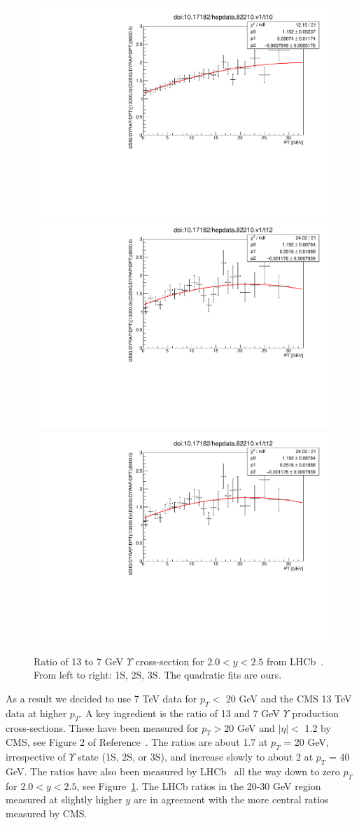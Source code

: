 \documentclass[12pt]{article}
\begin{document}
\begin{figure}
\begin{adjustwidth}{-2cm}{-2cm}
\centering
\includegraphics[width=0.32\linewidth]{../oniaDirect/LHCB-13-TeV/ups1s-13to7eta20to25.pdf}
\includegraphics[width=0.32\linewidth]{../oniaDirect/LHCB-13-TeV/ups3s-13to7eta20to25.pdf}
\includegraphics[width=0.32\linewidth]{../oniaDirect/LHCB-13-TeV/ups3s-13to7eta20to25.pdf}
\end{adjustwidth}
\caption{\protect Ratio of 13 to 7 GeV $\Upsilon$ cross-section for $2.0 < y < 2.5$
  from LHCb~\cite{Aaij:2018pfp}.  From left to right: 1S, 2S, 3S. 
  The quadratic fits are ours.}
\label{fig:upsratio}
\end{figure}


  
  As a result we decided to use 7 TeV data for $p_T <$ 20 GeV and the CMS
  13 TeV data at higher $p_T$.  A key ingredient is the ratio of 13 and 7
  GeV $\Upsilon$ production cross-sections.  These have been measured
  for $p_T > 20$ GeV and $|\eta| <$ 1.2 by CMS,
  see Figure 2 of Reference~\cite{Sirunyan:2017qdw}. The ratios
  are about 1.7 at $p_T$ = 20 GeV, irrespective of $\Upsilon$ state
  (1S, 2S, or 3S), and increase slowly to about 2
  at $p_T$ = 40 GeV.  The ratios have also been measured by
  LHCb~\cite{Aaij:2018pfp}
  all the way down to zero $p_T$ for $2.0 < y < 2.5$, see Figure~\ref{fig:upsratio}.
  The LHCb ratios in the 20-30 GeV region measured at slightly higher
  $y$ are in agreement with the more central
  ratios measured by CMS.
\end{document}
